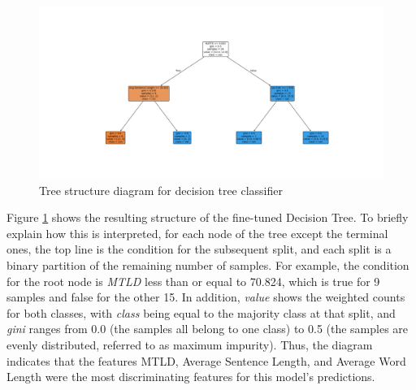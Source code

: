 \documentclass[12pt,a4paper]{article}
\numberwithin{figure}{section}
\numberwithin{table}{section}
\numberwithin{definition}{section}
\begin{document}
\begin{figure}[!h]
  \centering
        \includegraphics[width=1.0\textwidth]{decisiontree.png}
        \caption{Tree structure diagram for decision tree classifier}
        \label{fig:decisiontree}
\end{figure}

Figure \ref{fig:decisiontree} shows the resulting structure of the fine-tuned Decision Tree. To briefly explain how this is interpreted, for each node of the tree except the terminal ones, the top line is the condition for the subsequent split, and each split is a binary partition of the remaining number of samples. For example, the condition for the root node is \textit{MTLD} less than or equal to 70.824, which is true for 9 samples and false for the other 15. In addition, \textit{value} shows the weighted counts for both classes, with \textit{class} being equal to the majority class at that split, and \textit{gini} ranges from 0.0 (the samples all belong to one class) to 0.5 (the samples are evenly distributed, referred to as maximum impurity). Thus, the diagram indicates that the features MTLD, Average Sentence Length, and Average Word Length were the most discriminating features for this model's predictions. 
\end{document}
